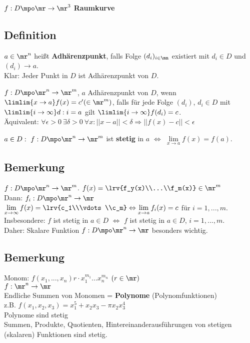 		$ f:D\mpo\mr\rightarrow\mr^3 $ \textbf{Raumkurve}
	\subExEnd

\subsection{Definition}
		\item $ a\in\mr^n $ heißt \textbf{Adhärenzpunkt}, falls Folge $ (d_i)_{i\in\mn} $ existiert mit $ d_i\in D $ und $ (d_i)\rightarrow a $.\\
		Klar: Jeder Punkt in $ D $ ist Adhärenzpunkt von $ D $.
		
		\item $ f:D\mpo\mr^n\rightarrow\mr^m $, $ a $ Adhärenzpunkt von $ D $, wenn $ \limlim{x\rightarrow a}f(x)=c'(\in\mr^m) $, falls für jede Folge $ (d_i) $, $ d_i\in D $ mit $ \limlim{i\rightarrow\infty}d:i=a $ gilt $ \limlim{i\rightarrow\infty}f(d_i)=c $.\\
		Äquivalent: $ \forall\epsilon >0\ \exists\delta>0\ \forall x:||x-a||<\delta\Rightarrow||f(x)-c||<\epsilon $
		
		\item $ a\in D:\ f:D\mpo\mr^n\rightarrow\mr^m $ ist \textbf{stetig} in $ a $ $ \Leftrightarrow $ $ \lim\limits_{x\rightarrow a}f(x)=f(a) $.
	\subExEnd

\subsection{Bemerkung}
	$ f:D\mpo\mr^n\rightarrow\mr^m $. $ f(x)=\lrv{f_y(x)\\...\\f_m(x)}\in\mr^m$\\
	Dann: $ f_i:D\mpo\mr^n\rightarrow\mr $\\
	$ \lim\limits_{x\rightarrow\infty}f(x)=\lrv{c_1\\\vdots\\c_m}\Leftrightarrow\lim\limits_{x\rightarrow a}f_i(x)=c $ für $ i=1,...,m $.\\
	Insbesondere: $ f $ ist stetig in $ a\in D $ $ \Leftrightarrow $ $ f $ ist stetig in $ a\in D $, $ i=1,...,m $.\\
	Daher: Skalare Funktion $ f:D\mpo\mr^n\rightarrow\mr $ besonders wichtig.
	
\subsection{Bemerkung}
	Monom: $ f(x_1,...,x_n)r\cdot x_1^{m_1}...x_n^{m_n} $ $ (r\in\mr) $\\
	$ f:\mr^n\rightarrow\mr $\\
	Endliche Summen von Monomen = \textbf{Polynome} (Polynomfunktionen)\\
	z.B. $ f(x_1,x_2,x_3)=x_1^5+x_2x_3-\pi x_2x_3^4 $\\
	Polynome sind stetig\\
	Summen, Produkte, Quotienten, Hintereinanderausführungen von stetigen (skalaren) Funktionen sind stetig.
	
